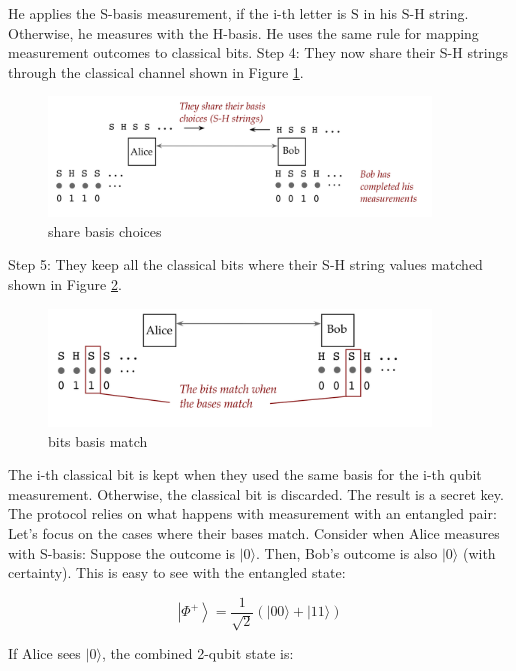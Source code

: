 \documentclass[main.tex]{subfiles}
\begin{document}
    He applies the S-basis measurement, if the i-th letter is $\mathrm{S}$ in his $\mathrm{S}$-H string. Otherwise, he measures with the H-basis. He uses the same rule for mapping measurement outcomes to classical bits. Step 4: They now share their S-H strings through the classical channel shown in Figure \ref{fig:16ekert6}.
    
    \begin{figure}
        \centering
        \includegraphics[width=4in]{notes/figs/n06/16ekert6.png}
        \caption{share basis choices}
        \label{fig:16ekert6}
    \end{figure}
    
    Step 5: They keep all the classical bits where their S-H string values matched shown in Figure \ref{fig:17ekert7}.
    
    \begin{figure}
        \centering
        \includegraphics[width=4in]{notes/figs/n06/17ekert7.png}
        \caption{bits basis match}
        \label{fig:17ekert7}
    \end{figure}
    
    The i-th classical bit is kept when they used the same basis for the i-th qubit measurement. Otherwise, the classical bit is discarded. The result is a secret key. The protocol relies on what happens with measurement with an entangled pair: Let's focus on the cases where their bases match. Consider when Alice measures with S-basis: Suppose the outcome is $|0\rangle$. Then, Bob's outcome is also $|0\rangle$ (with certainty). This is easy to see with the entangled state:
    
    $$
    \left|\Phi^{+}\right\rangle=\frac{1}{\sqrt{2}}(|00\rangle+|11\rangle)
    $$
    
    If Alice sees $|0\rangle$, the combined 2-qubit state is:
    
\end{document}
